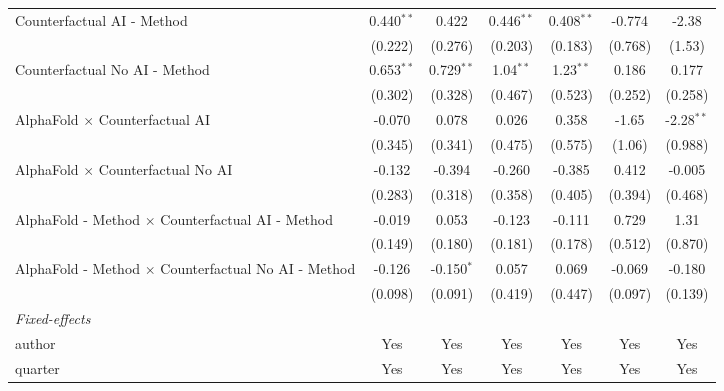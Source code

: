 \begin{tabular}{lcccccc}
   Counterfactual AI - Method                                 & 0.440$^{**}$ & 0.422        & 0.446$^{**}$ & 0.408$^{**}$ & -0.774  & -2.38\\   
                                                              & (0.222)      & (0.276)      & (0.203)      & (0.183)      & (0.768) & (1.53)\\   
   Counterfactual No AI - Method                              & 0.653$^{**}$ & 0.729$^{**}$ & 1.04$^{**}$  & 1.23$^{**}$  & 0.186   & 0.177\\   
                                                              & (0.302)      & (0.328)      & (0.467)      & (0.523)      & (0.252) & (0.258)\\   
   AlphaFold $\times$ Counterfactual AI                       & -0.070       & 0.078        & 0.026        & 0.358        & -1.65   & -2.28$^{**}$\\   
                                                              & (0.345)      & (0.341)      & (0.475)      & (0.575)      & (1.06)  & (0.988)\\   
   AlphaFold $\times$ Counterfactual No AI                    & -0.132       & -0.394       & -0.260       & -0.385       & 0.412   & -0.005\\   
                                                              & (0.283)      & (0.318)      & (0.358)      & (0.405)      & (0.394) & (0.468)\\   
   AlphaFold - Method $\times$ Counterfactual AI - Method     & -0.019       & 0.053        & -0.123       & -0.111       & 0.729   & 1.31\\   
                                                              & (0.149)      & (0.180)      & (0.181)      & (0.178)      & (0.512) & (0.870)\\   
   AlphaFold - Method $\times$ Counterfactual No AI - Method  & -0.126       & -0.150$^{*}$ & 0.057        & 0.069        & -0.069  & -0.180\\   
                                                              & (0.098)      & (0.091)      & (0.419)      & (0.447)      & (0.097) & (0.139)\\   
   \midrule
   \emph{Fixed-effects}\\
   author                                                     & Yes          & Yes          & Yes          & Yes          & Yes     & Yes\\  
   quarter                                                    & Yes          & Yes          & Yes          & Yes          & Yes     & Yes\\  

\end{tabular}
